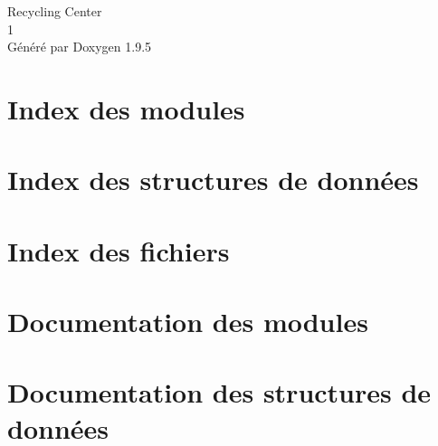 \documentclass[twoside]{book}
\newcommand{\+}{\discretionary{\mbox{\scriptsize$\hookleftarrow$}}{}{}}
\newcommand{\clearemptydoublepage}{%
    \newpage{\pagestyle{empty}\cleardoublepage}%
  }
\begin{document}
  \raggedbottom
    \hypersetup{pageanchor=false,
                bookmarksnumbered=true,
                pdfencoding=unicode
               }
  \begin{titlepage}
  \vspace*{7cm}
  \begin{center}%
  {\Large Recycling Center}\\
  [1ex]\large 1 \\
  \vspace*{1cm}
  {\large Généré par Doxygen 1.9.5}\\
  \end{center}
  \end{titlepage}
  \clearemptydoublepage
  \tableofcontents
  \clearemptydoublepage
  \hypersetup{pageanchor=true}
\chapter{Index des modules}

\chapter{Index des structures de données}

\chapter{Index des fichiers}

\chapter{Documentation des modules}









\chapter{Documentation des structures de données}










\end{document}
